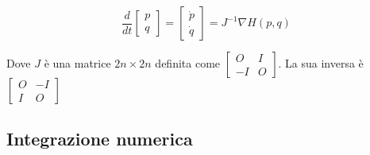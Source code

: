 \documentclass[a4paper, openright, twoside]{article}
\numberwithin{equation}{subsection}
\begin{document}
\begin{equation}
	\frac{d}{dt}
	\begin{bmatrix}
		p\\q
	\end{bmatrix} =
	\begin{bmatrix}
		\dot{p}\\\dot{q}
	\end{bmatrix} = 
	J^{-1}\nabla H(p,q)
\end{equation}

Dove $J$ è una matrice $2n\times 2n$ definita come $\begin{bmatrix}
	O&I\\-I&O \end{bmatrix}$. La sua inversa è $\begin{bmatrix}
	O&-I\\I&O \end{bmatrix}$


\subsection{Integrazione numerica}
\end{document}

